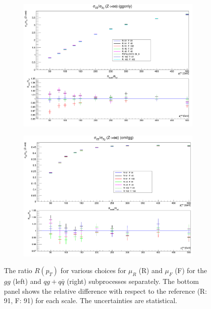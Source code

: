 \documentclass[11pt,a4paper,final]{report}
\begin{document}
\begin{figure}[H]
\centering
	\begin{subfigure}{0.49\textwidth}
		\includegraphics[width=\linewidth]{scale/ggonly_nlo_scale_overlay.png}
		\caption{}
	\end{subfigure}
	\begin{subfigure}{0.49\textwidth}
		\includegraphics[width=\linewidth]{scale/omitgg_nlo_scale_overlay.png}
		\caption{}
	\end{subfigure}	
\caption{The ratio $R(p_T)$ for various choices for $\mu_R$ (R) and $\mu_F$ (F) for the $gg$ (left) and $qg+q\bar{q}$ (right) subprocesses separately. The bottom panel shows the relative difference with respect to the reference (R: 91, F: 91) for each scale. The uncertainties are statistical.}
\label{fig:gg_scale}
\end{figure}
\end{document}
